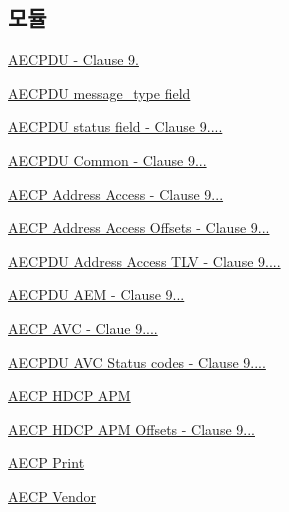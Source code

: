\subsection*{모듈}
\begin{DoxyCompactItemize}
\item 
\hyperlink{group__aecpdu}{A\+E\+C\+P\+D\+U -\/ Clause 9.}
\item 
\hyperlink{group__aecp__message__type}{A\+E\+C\+P\+D\+U message\+\_\+type field}
\item 
\hyperlink{group__aecp__status}{A\+E\+C\+P\+D\+U status field -\/ Clause 9....}
\item 
\hyperlink{group__aecpdu__common}{A\+E\+C\+P\+D\+U Common -\/ Clause 9...}
\item 
\hyperlink{group___a_e_c_p___a_a}{A\+E\+C\+P Address Access -\/ Clause 9...}
\item 
\hyperlink{group___a_e_c_p___a_a__offsets}{A\+E\+C\+P Address Access Offsets -\/ Clause 9...}
\item 
\hyperlink{group__aecp__aa__tlv}{A\+E\+C\+P\+D\+U Address Access T\+L\+V -\/ Clause 9....}
\item 
\hyperlink{group__aecpdu__aem}{A\+E\+C\+P\+D\+U A\+E\+M -\/ Clause 9...}
\item 
\hyperlink{group__aecp__avc}{A\+E\+C\+P A\+V\+C -\/ Claue 9....}
\item 
\hyperlink{group___a_e_c_p__avc__status}{A\+E\+C\+P\+D\+U A\+V\+C Status codes -\/ Clause 9....}
\item 
\hyperlink{group__aecpdu__hdcp__apm}{A\+E\+C\+P H\+D\+C\+P A\+PM}
\item 
\hyperlink{group__aecpdu__hdcp__apm__offsets}{A\+E\+C\+P H\+D\+C\+P A\+P\+M Offsets -\/ Clause 9...}
\item 
\hyperlink{group__aecp__print}{A\+E\+C\+P Print}
\item 
\hyperlink{group__aecp__vendor}{A\+E\+C\+P Vendor}
\end{DoxyCompactItemize}

